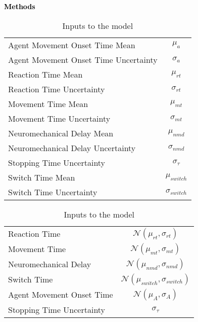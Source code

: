 \documentclass[12pt,letterpaper]{article}
\newcommand{\SethCaption}[2]{\noindent\textbf{\textcolor{black}{#1}} {#2}}
\newcommand{\SectionHeader}[1]{\noindent\textbf{\Large{\textcolor{black}{#1}}}\normalsize }
\begin{document}


\SectionHeader{Methods}
\begin{table}[h]
    \centering
    \begin{tabular}{|l | c|}
        \hline
        Agent Movement Onset Time Mean        & $\mu_{a}$         \\
        Agent Movement Onset Time Uncertainty & $\sigma_{a}$      \\
        Reaction Time Mean                    & $\mu_{rt}$        \\
        Reaction Time Uncertainty             & $\sigma_{rt}$     \\
        Movement Time Mean                    & $\mu_{mt}$        \\
        Movement Time Uncertainty             & $\sigma_{mt}$     \\
        Neuromechanical Delay Mean            & $\mu_{nmd}$       \\
        Neuromechanical Delay Uncertainty     & $\sigma_{nmd}$    \\
        Stopping Time Uncertainty             & $\sigma_{\tau}$   \\
        Switch Time Mean                      & $\mu_{switch}$    \\
        Switch Time Uncertainty               & $\sigma_{switch}$ \\
        \hline
    \end{tabular}
    \caption[]{Inputs to the model}
\end{table}

\begin{table}[h]
    \centering
    \begin{tabular}{|l | c|}
        \hline
        Reaction Time             & $\mathcal{N}(\mu_{rt},\sigma_{rt})$         \\
        Movement Time             & $\mathcal{N}(\mu_{mt},\sigma_{mt})$         \\
        Neuromechanical Delay     & $\mathcal{N}(\mu_{nmd},\sigma_{nmd})$       \\
        Switch Time               & $\mathcal{N}(\mu_{switch},\sigma_{switch})$ \\
        Agent Movement Onset Time & $\mathcal{N}(\mu_{A},\sigma_{A})$           \\
        Stopping Time Uncertainty & $\sigma_{\tau}$                             \\
        \hline
    \end{tabular}
    \caption[]{Inputs to the model}
\end{table}
\end{document}
